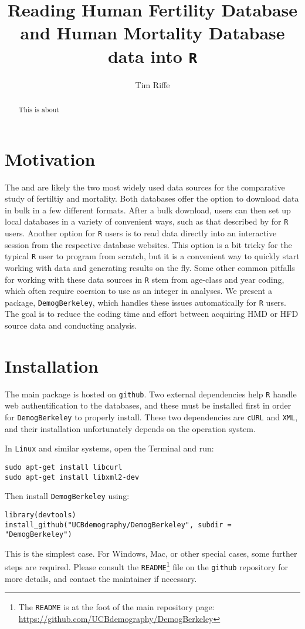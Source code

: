 \documentclass{article}
\begin{document}
\title{Reading Human Fertility Database and Human Mortality Database data into \texttt{R}}
\author{Tim Riffe}
\maketitle
\begin{abstract}
This is about
\end{abstract}

\section{Motivation}
The \citet{HFD} and \citet{HMD} are likely the two most widely used data sources
for the comparative study of fertiltiy and mortality. Both databases offer the
option to download data in bulk in a few different formats. After a bulk
download, users can then set up local databases in a variety of
convenient ways, such as that described by \citet{minton2015} for \texttt{R}
\citep{Rcitation} users. Another option for \texttt{R} users is to read data
directly into an interactive session from the respective database websites. This
option is a bit tricky for the typical \texttt{R} user to program from scratch,
but it is a convenient way to quickly start working with data and
generating results on the fly. Some other common pitfalls for working with
these data sources in \texttt{R} stem from age-class and year coding, which
often require coersion to use as an integer in analyses. We present a package,
\texttt{DemogBerkeley}, which handles these issues automatically for \texttt{R}
users. The goal is to reduce the coding time and effort between acquiring
HMD or HFD source data and conducting analysis.

\section{Installation}
The main package is hosted on \texttt{github}. Two external dependencies help
\texttt{R} handle web authentification to the databases, and these must be installed first in order for \texttt{DemogBerkeley}
to properly install. These two dependencies are \texttt{cURL} and \texttt{XML},
and their installation unfortunately depends on the operation system. 

In \texttt{Linux} and similar systems, open the Terminal and run:
\begin{verbatim}
sudo apt-get install libcurl
sudo apt-get install libxml2-dev
\end{verbatim}
Then install \texttt{DemogBerkeley} using:
\begin{verbatim}
library(devtools)
install_github("UCBdemography/DemogBerkeley", subdir = "DemogBerkeley")
\end{verbatim}
This is the simplest case. For Windows, Mac, or other special cases, some
further steps are required. Please consult the
\texttt{README}\footnote{The
\texttt{README} is at the
foot of the main repository
page: \url{https://github.com/UCBdemography/DemogBerkeley}} file on the
\texttt{github} repository for more details, and contact the maintainer if
necessary.
\end{document}
